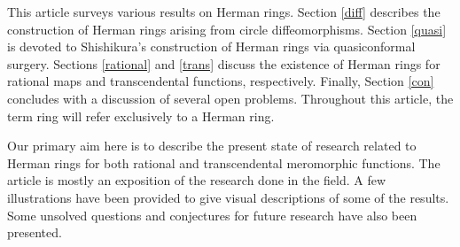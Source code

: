 \documentclass[12pt]{article}
\begin{document}
 This article surveys various results on Herman rings. Section \ref{diff} describes the construction of Herman rings arising from circle diffeomorphisms. Section \ref{quasi} is devoted to Shishikura’s construction of Herman rings via quasiconformal surgery. Sections \ref{rational} and \ref{trans} discuss the existence of Herman rings for rational maps and transcendental functions, respectively. Finally, Section \ref{con} concludes with a discussion of several open problems. Throughout this article, the term ring will refer exclusively to a Herman ring.
 
 Our primary aim here is to describe the present state of research related to Herman rings for both rational and transcendental meromorphic functions. The article is mostly an exposition of the research done in the field. A few illustrations have been provided to give visual descriptions of some of the results. Some unsolved questions and conjectures for future research have also been presented.
 
 
 

\end{document}
